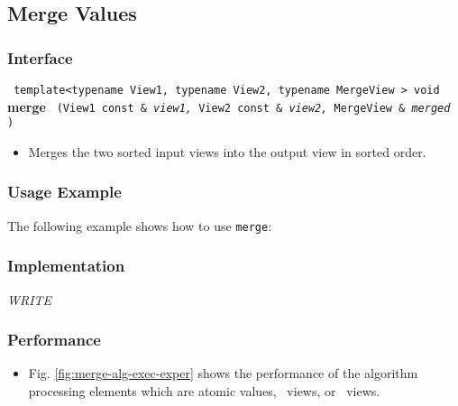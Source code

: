 
\subsection{Merge Values} \label{sec-sort-merge}

\subsubsection{Interface} %

\noindent
\texttt{%
template<typename View1, typename View2, typename MergeView >
\newline
void 
}
\newline
\textbf{merge}%
\texttt{%
(View1 const \&
\textit{view1,}%
View2 const \&
\textit{view2,}%
MergeView \&
\textit{merged}%
)
}

\begin{itemize}
\item
Merges the two sorted input views into the output view in sorted order. 
\end{itemize}

\subsubsection{Usage Example} %

The following example shows how to use \texttt{merge}:

 
\subsubsection{Implementation} %

\textit{WRITE}

\subsubsection{Performance} %

\begin{itemize}
\item
Fig. \ref{fig:merge-alg-exec-exper}
shows the performance of the algorithm processing
elements which are atomic values, \stl\ views, or \stapl\ views.
\end{itemize}

